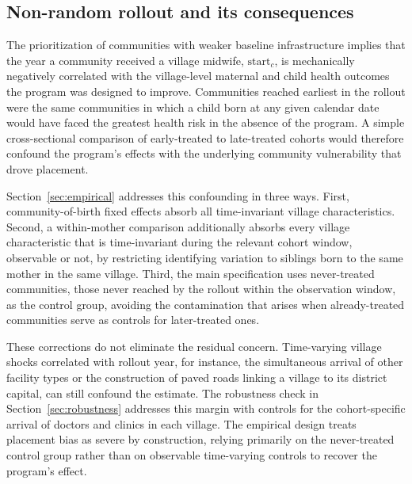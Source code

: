 \subsection{Non-random rollout and its consequences}

The prioritization of communities with weaker baseline infrastructure implies that the year a community received a village midwife, $\text{start}_c$, is mechanically negatively correlated with the village-level maternal and child health outcomes the program was designed to improve. Communities reached earliest in the rollout were the same communities in which a child born at any given calendar date would have faced the greatest health risk in the absence of the program. A simple cross-sectional comparison of early-treated to late-treated cohorts would therefore confound the program's effects with the underlying community vulnerability that drove placement.

Section~\ref{sec:empirical} addresses this confounding in three ways. First, community-of-birth fixed effects absorb all time-invariant village characteristics. Second, a within-mother comparison additionally absorbs every village characteristic that is time-invariant during the relevant cohort window, observable or not, by restricting identifying variation to siblings born to the same mother in the same village. Third, the main specification uses never-treated communities, those never reached by the rollout within the observation window, as the control group, avoiding the contamination that arises when already-treated communities serve as controls for later-treated ones.

These corrections do not eliminate the residual concern. Time-varying village shocks correlated with rollout year, for instance, the simultaneous arrival of other facility types or the construction of paved roads linking a village to its district capital, can still confound the estimate. The robustness check in Section~\ref{sec:robustness} addresses this margin with controls for the cohort-specific arrival of doctors and clinics in each village. The empirical design treats placement bias as severe by construction, relying primarily on the never-treated control group rather than on observable time-varying controls to recover the program's effect.
